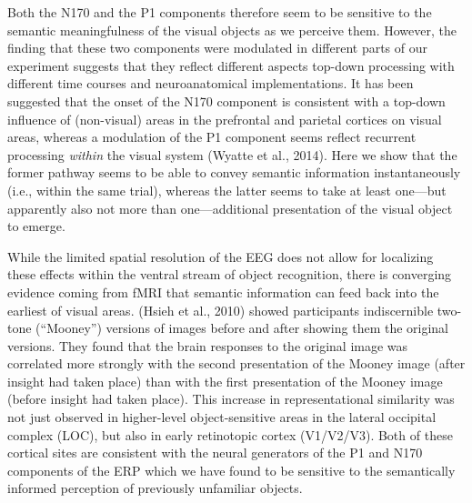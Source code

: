 \documentclass[
  english,
  doc,12pt,twoside,floatsintext]{apa7}
\begin{document}
Both the N170 and the P1 components therefore seem to be sensitive to the semantic meaningfulness of the visual objects as we perceive them. However, the finding that these two components were modulated in different parts of our experiment suggests that they reflect different aspects top-down processing with different time courses and neuroanatomical implementations. It has been suggested that the onset of the N170 component is consistent with a top-down influence of (non-visual) areas in the prefrontal and parietal cortices on visual areas, whereas a modulation of the P1 component seems reflect recurrent processing \emph{within} the visual system (Wyatte et al., 2014). Here we show that the former pathway seems to be able to convey semantic information instantaneously (i.e., within the same trial), whereas the latter seems to take at least one---but apparently also not more than one---additional presentation of the visual object to emerge.

While the limited spatial resolution of the EEG does not allow for localizing these effects within the ventral stream of object recognition, there is converging evidence coming from fMRI that semantic information can feed back into the earliest of visual areas. (Hsieh et al., 2010) showed participants indiscernible two-tone (``Mooney'') versions of images before and after showing them the original versions. They found that the brain responses to the original image was correlated more strongly with the second presentation of the Mooney image (after insight had taken place) than with the first presentation of the Mooney image (before insight had taken place). This increase in representational similarity was not just observed in higher-level object-sensitive areas in the lateral occipital complex (LOC), but also in early retinotopic cortex (V1/V2/V3). Both of these cortical sites are consistent with the neural generators of the P1 and N170 components of the ERP which we have found to be sensitive to the semantically informed perception of previously unfamiliar objects.
\end{document}
